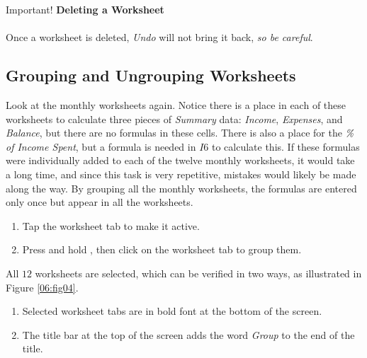 \begin{center}
	\begin{infobox}{Important!}
		\textbf{Deleting a Worksheet}
		\\
		\\
		Once a worksheet is deleted, \textit{Undo} will not bring it back, \textit{so be careful}.
	\end{infobox}
\end{center}

\subsection{Grouping and Ungrouping Worksheets}

Look at the monthly worksheets again. Notice there is a place in each of these worksheets to calculate three pieces of \textit{Summary} data: \textit{Income}, \textit{Expenses}, and \textit{Balance}, but there are no formulas in these cells. There is also a place for the \textit{\% of Income Spent}, but a formula is needed in $ I6 $ to calculate this. If these formulas were individually added to each of the twelve monthly worksheets, it would take a long time, and since this task is very repetitive, mistakes would likely be made along the way. By grouping all the monthly worksheets, the formulas are entered only once but appear in all the worksheets.

\begin{enumbox}
	\begin{enumerate}
		\item Tap the  worksheet tab to make it active.
		\item Press and hold , then click on the  worksheet tab to group them.
	\end{enumerate}
\end{enumbox}

All $ 12 $ worksheets are selected, which can be verified in two ways, as illustrated in Figure \ref{06:fig04}.

\begin{enumbox}
	\begin{enumerate}
		\item Selected worksheet tabs are in bold font at the bottom of the screen.
		\item The title bar at the top of the screen adds the word \textit{Group} to the end of the title.
	\end{enumerate}
\end{enumbox}

